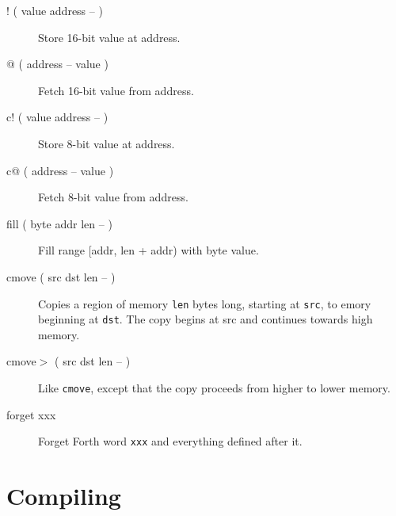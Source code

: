 \begin{description}
\item[! ( value address -- )] Store 16-bit value at address.  
\item[@ ( address -- value )] Fetch 16-bit value from address.  
\item[c! ( value address -- )] Store 8-bit value at address.  
\item[c@ ( address -- value )] Fetch 8-bit value from address.
\item[fill ( byte addr len -- )] Fill range [addr, len + addr) with byte value.
\item[cmove ( src dst len -- )]
Copies a region of memory \texttt{len} bytes long, starting at \texttt{src}, to emory beginning at \texttt{dst}. The copy begins at src and continues towards high memory.
\item[cmove$>$ ( src dst len -- )]
Like \texttt{cmove}, except that the copy proceeds from higher to lower memory.
\item[forget xxx] Forget Forth word \texttt{xxx} and everything defined after it.

\end{description}
\section{Compiling}


